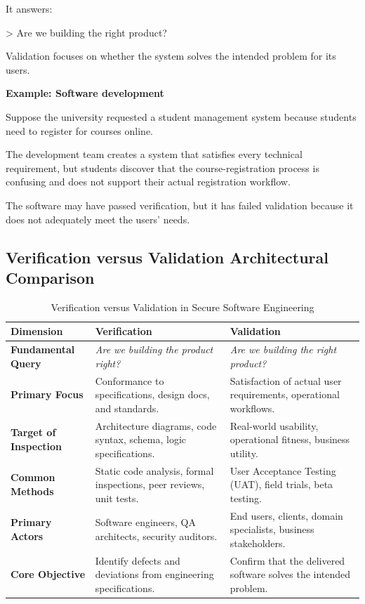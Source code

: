 It answers:

> Are we building the right product?

Validation focuses on whether the system solves the intended problem for its users.

\textbf{Example: Software development}

Suppose the university requested a student management system because students need to register for courses online.

The development team creates a system that satisfies every technical requirement, but students discover that the course-registration process is confusing and does not support their actual registration workflow.

The software may have passed verification, but it has failed validation because it does not adequately meet the users' needs.

\subsection{Verification versus Validation Architectural Comparison}

\begin{table}[htbp]
\centering
\caption{Verification versus Validation in Secure Software Engineering}
\label{tab:verification_vs_validation}
\begin{tabularx}{\textwidth}{p{3.2cm} p{5.2cm} X}
\toprule
\textbf{Dimension} & \textbf{Verification} & \textbf{Validation} \\
\midrule
\textbf{Fundamental Query} & \textit{Are we building the product right?} & \textit{Are we building the right product?} \\
\textbf{Primary Focus} & Conformance to specifications, design docs, and standards. & Satisfaction of actual user requirements, operational workflows. \\
\textbf{Target of Inspection} & Architecture diagrams, code syntax, schema, logic specifications. & Real-world usability, operational fitness, business utility. \\
\textbf{Common Methods} & Static code analysis, formal inspections, peer reviews, unit tests. & User Acceptance Testing (UAT), field trials, beta testing. \\
\textbf{Primary Actors} & Software engineers, QA architects, security auditors. & End users, clients, domain specialists, business stakeholders. \\
\textbf{Core Objective} & Identify defects and deviations from engineering specifications. & Confirm that the delivered software solves the intended problem. \\
\bottomrule
\end{tabularx}
\end{table}



